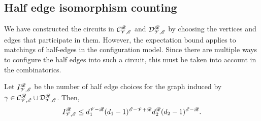 \subsection{Half edge isomorphism counting}
   
We have constructed the circuits in 
$\mathcal{C}_{\mathscr{V}, \mathscr{E}}^{\mathscr{R}}$
and
$\mathcal{D}_{\mathscr{V}, \mathscr{E}}^{\mathscr{R}}$
by choosing the vertices and edges that participate in them.
However, the expectation bound applies to matchings
of half-edges in the configuration model.
Since there are multiple ways to configure the half edges 
into such a circuit, this must
be taken into account in the combinatorics.

\begin{lemma}
\label{lem:edge_iso}
Let $I_{\mathscr{V}, \mathscr{E}}^{\mathscr{R}}$
be the number of half edge choices for the graph
induced by
$\gamma \in \mathcal{C}_{\mathscr{V}, \mathscr{E}}^{\mathscr{R}}
\cup \mathcal{D}_{\mathscr{V}, \mathscr{E}}^{\mathscr{R}}$.
Then,
\begin{equation}
    I_{\mathscr{V}, \mathscr{E}}^{\mathscr{R}} 
    \leq 
    d_1^{\mathscr{V} - \mathscr{R}} 
    (d_1 - 1)^{\mathscr{E} - \mathscr{V} + \mathscr{R}}
    d_2^{\mathscr{R}}
    (d_2 - 1)^{\mathscr{E} - \mathscr{R}} .
\end{equation}
\end{lemma}

